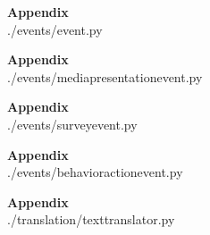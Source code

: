 \begin{mdlisting}
\begin{center} \textbf{Appendix }\\ ./events/event.py \end{center}

\end{mdlisting}

\begin{mdlisting}
\begin{center} \textbf{Appendix }\\ ./events/mediapresentationevent.py \end{center}

\end{mdlisting}

\begin{mdlisting}
\begin{center} \textbf{Appendix }\\ ./events/surveyevent.py \end{center}

\end{mdlisting}

\begin{mdlisting}
\begin{center} \textbf{Appendix }\\ ./events/behavioractionevent.py \end{center}

\end{mdlisting}


\begin{mdlisting}
\begin{center} \textbf{Appendix }\\ ./translation/texttranslator.py \end{center}

\end{mdlisting}



